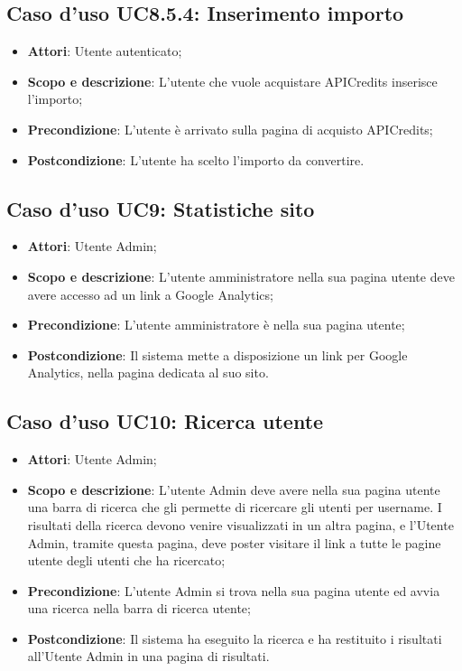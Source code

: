 \documentclass[12pt,a4paper,titlepage]{article}
\begin{document}
	\subsection{Caso d'uso UC8.5.4: Inserimento importo}
	\label{UC8.5.4}
	\begin{itemize}
		\item \textbf{Attori}: Utente autenticato;
		\item \textbf{Scopo e descrizione}: L'utente che vuole acquistare APICredits inserisce l'importo;
		\item \textbf{Precondizione}: L'utente è arrivato sulla pagina di acquisto APICredits;
		\item \textbf{Postcondizione}: L'utente ha scelto l'importo da convertire.
	\end{itemize}
	\subsection{Caso d'uso UC9: Statistiche sito}
	\label{UC9}
	\begin{itemize}
		\item \textbf{Attori}: Utente Admin;
		\item \textbf{Scopo e descrizione}: L'utente amministratore nella sua pagina utente deve avere accesso ad un link a Google Analytics;
		\item \textbf{Precondizione}: L'utente amministratore è nella sua pagina utente;
		\item \textbf{Postcondizione}: Il sistema mette a disposizione un link per Google Analytics, nella pagina dedicata al suo sito.
	\end{itemize}
	\subsection{Caso d'uso UC10: Ricerca utente}
	\label{UC10}
	\begin{itemize}
		\item \textbf{Attori}: Utente Admin;
		\item \textbf{Scopo e descrizione}: L'utente Admin deve avere nella sua pagina utente una barra di ricerca che gli permette di ricercare gli utenti per username. I risultati della ricerca devono venire visualizzati in un altra pagina, e l'Utente Admin, tramite questa pagina, deve poster visitare il link a tutte le pagine utente degli utenti che ha ricercato;
		\item \textbf{Precondizione}: L'utente Admin si trova nella sua pagina utente ed avvia una ricerca nella barra di ricerca utente;
		\item \textbf{Postcondizione}: Il sistema ha eseguito la ricerca e ha restituito i risultati all'Utente Admin in una pagina di risultati.
	\end{itemize}
\end{document}
